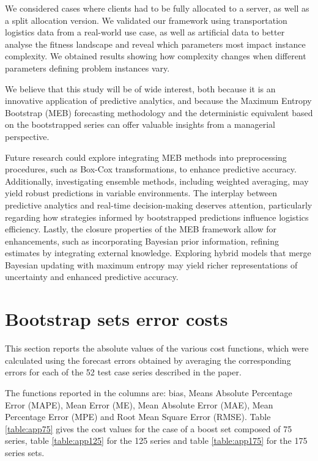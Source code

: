 \documentclass[preprint,11pt,authoryear]{elsarticle}
\begin{document}
We considered cases where clients had to be fully allocated to a server, as well as a split allocation version. We validated our framework using transportation logistics data from a real-world use case, as well as artificial data to better analyse the fitness landscape and reveal which parameters most impact instance complexity. We obtained results showing how complexity changes when different parameters defining problem instances vary.

We believe that this study will be of wide interest, both because it is an innovative application of predictive analytics, and because the Maximum Entropy Bootstrap (MEB) forecasting methodology and the deterministic equivalent based on the bootstrapped series can offer valuable insights from a managerial perspective.

Future research could explore integrating MEB methods into preprocessing procedures, such as Box-Cox transformations, to enhance predictive accuracy. Additionally, investigating ensemble methods, including weighted averaging, may yield robust predictions in variable environments. The interplay between predictive analytics and real-time decision-making deserves attention, particularly regarding how strategies informed by bootstrapped predictions influence logistics efficiency. Lastly, the closure properties of the MEB framework allow for enhancements, such as incorporating Bayesian prior information, refining estimates by integrating external knowledge. Exploring hybrid models that merge Bayesian updating with maximum entropy may yield richer representations of uncertainty and enhanced predictive accuracy.

\clearpage %

\appendix
\section{Bootstrap sets error costs} \label{app:errcost}

This section reports the absolute values of the various cost functions, which were calculated using the forecast errors obtained by averaging the corresponding errors for each of the 52 test case series described in the paper.

The functions reported in the columns are: bias, Means Absolute Percentage Error (MAPE), Mean Error (ME), Mean Absolute Error (MAE), Mean Percentage Error (MPE) and Root Mean Square Error (RMSE). Table \ref{table:app75} gives the cost values for the case of a boost set composed of 75 series, table \ref{table:app125} for the 125 series and table \ref{table:app175} for the 175 series sets.
\end{document}
